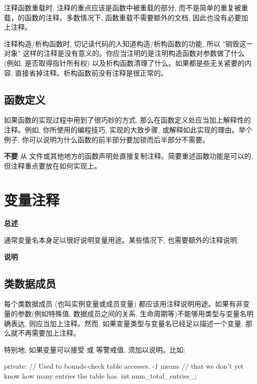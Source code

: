 注释函数重载时, 注释的重点应该是函数中被重载的部分, 而不是简单的重复被重载，的函数的注释。多数情况下, 函数重载不需要额外的文档, 因此也没有必要加上注释。

注释构造/析构函数时, 切记读代码的人知道构造/析构函数的功能, 所以 "销毁这一对象" 这样的注释是没有意义的。你应当注明的是注明构造函数对参数做了什么 (例如, 是否取得指针所有权) 以及析构函数清理了什么。如果都是些无关紧要的内容, 直接省掉注释。析构函数前没有注释是很正常的。

\subsection{函数定义}

如果函数的实现过程中用到了很巧妙的方式, 那么在函数定义处应当加上解释性的注释。例如, 你所使用的编程技巧, 实现的大致步骤, 或解释如此实现的理由。举个例子, 你可以说明为什么函数的前半部分要加锁而后半部分不需要。

\textbf{不要} 从  文件或其他地方的函数声明处直接复制注释。简要重述函数功能是可以的, 但注释重点要放在如何实现上。

\section{变量注释}

\textbf{总述}

通常变量名本身足以很好说明变量用途。某些情况下, 也需要额外的注释说明.

\textbf{说明}

\subsection{类数据成员}

每个类数据成员 (也叫实例变量或成员变量) 都应该用注释说明用途。如果有非变量的参数(例如特殊值, 数据成员之间的关系, 生命周期等)不能够用类型与变量名明确表达, 则应当加上注释。然而, 如果变量类型与变量名已经足以描述一个变量, 那么就不再需要加上注释。

特别地, 如果变量可以接受  或  等警戒值, 须加以说明。比如:

\begin{cppcode}
private:
// Used to bounds-check table accesses. -1 means
// that we don't yet know how many entries the table has.
int num_total_entries_;
\end{cppcode}

